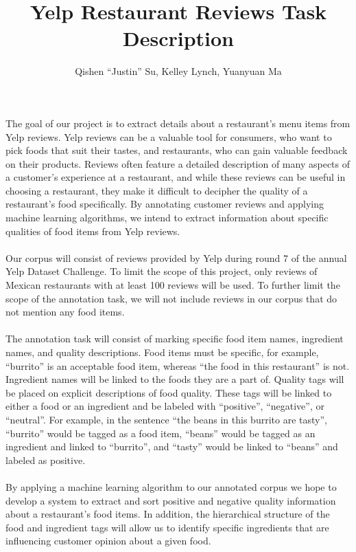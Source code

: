 \documentclass{article}
\title{Yelp Restaurant Reviews Task Description}
\author{Qishen ``Justin'' Su, Kelley Lynch, Yuanyuan Ma}
\begin{document}
\newpage
{}
\maketitle

\paragraph{}
The goal of our project is to extract details about a restaurant's menu items from Yelp reviews. Yelp reviews can be a valuable tool for consumers, who want to pick foods that suit their tastes, and restaurants, who can gain valuable feedback on their products. Reviews often feature a detailed description of many aspects of a customer’s experience at a restaurant, and while these reviews can be useful in choosing a restaurant, they make it difficult to decipher the quality of a restaurant’s food specifically. By annotating customer reviews and applying machine learning algorithms, we intend to extract information about specific qualities of food items from Yelp reviews.
\paragraph{}
Our corpus will consist of reviews provided by Yelp during round 7 of the annual Yelp Dataset Challenge. To limit the scope of this project, only reviews of Mexican restaurants with at least 100 reviews will be used. To further limit the scope of the annotation task, we will not include reviews in our corpus that do not mention any food items. 
\paragraph{}
The annotation task will consist of marking specific food item names, ingredient names, and quality descriptions. Food items must be specific, for example, “burrito” is an acceptable food item, whereas “the food in this restaurant” is not. Ingredient names will be linked to the foods they are a part of. Quality tags will be placed on explicit descriptions of food quality. These tags will be linked to either a food or an ingredient and be labeled with “positive”, “negative”, or “neutral”. For example, in the sentence “the beans in this burrito are tasty”, “burrito” would be tagged as a food item, “beans” would be tagged as an ingredient and linked to “burrito”, and “tasty” would be linked to “beans” and labeled as positive. 
\paragraph{}
By applying a machine learning algorithm to our annotated corpus we hope to develop a system to extract and sort positive and negative quality information about a restaurant’s food items. In addition, the hierarchical structure of the food and ingredient tags will allow us to identify specific ingredients that are influencing customer opinion about a given food. 
\end{document}
